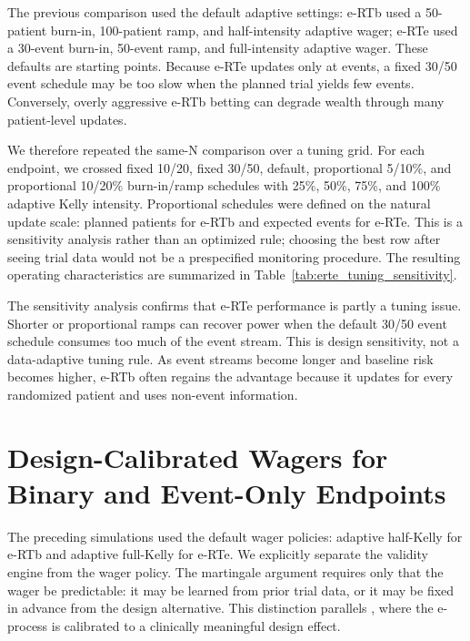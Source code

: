 \documentclass[10pt]{article}
\begin{document}
The previous comparison used the default adaptive settings: e-RTb used a 50-patient burn-in, 100-patient ramp, and half-intensity adaptive wager; e-RTe used a 30-event burn-in, 50-event ramp, and full-intensity adaptive wager. These defaults are starting points. Because e-RTe updates only at events, a fixed 30/50 event schedule may be too slow when the planned trial yields few events. Conversely, overly aggressive e-RTb betting can degrade wealth through many patient-level updates.

We therefore repeated the same-N comparison over a tuning grid. For each endpoint, we crossed fixed 10/20, fixed 30/50, default, proportional 5/10\%, and proportional 10/20\% burn-in/ramp schedules with 25\%, 50\%, 75\%, and 100\% adaptive Kelly intensity. Proportional schedules were defined on the natural update scale: planned patients for e-RTb and expected events for e-RTe. This is a sensitivity analysis rather than an optimized rule; choosing the best row after seeing trial data would not be a prespecified monitoring procedure. The resulting operating characteristics are summarized in Table~\ref{tab:erte_tuning_sensitivity}.



The sensitivity analysis confirms that e-RTe performance is partly a tuning issue. Shorter or proportional ramps can recover power when the default 30/50 event schedule consumes too much of the event stream. This is design sensitivity, not a data-adaptive tuning rule. As event streams become longer and baseline risk becomes higher, e-RTb often regains the advantage because it updates for every randomized patient and uses non-event information.

\section{Design-Calibrated Wagers for Binary and Event-Only Endpoints}

The preceding simulations used the default wager policies: adaptive half-Kelly for e-RTb and adaptive full-Kelly for e-RTe. We explicitly separate the validity engine from the wager policy. The martingale argument requires only that the wager be predictable: it may be learned from prior trial data, or it may be fixed in advance from the design alternative. This distinction parallels \citet{sokolova2026evalues}, where the e-process is calibrated to a clinically meaningful design effect.
\end{document}
